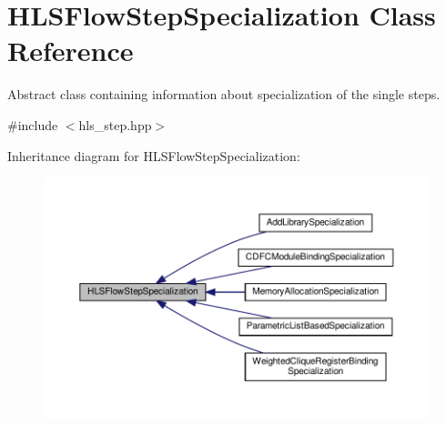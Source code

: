 \hypertarget{classHLSFlowStepSpecialization}{}\section{H\+L\+S\+Flow\+Step\+Specialization Class Reference}
\label{classHLSFlowStepSpecialization}


Abstract class containing information about specialization of the single steps.  




{\ttfamily \#include $<$hls\+\_\+step.\+hpp$>$}



Inheritance diagram for H\+L\+S\+Flow\+Step\+Specialization\+:
\nopagebreak
\begin{figure}[H]
\begin{center}
\leavevmode
\includegraphics[width=350pt]{de/d13/classHLSFlowStepSpecialization__inherit__graph}
\end{center}
\end{figure}
